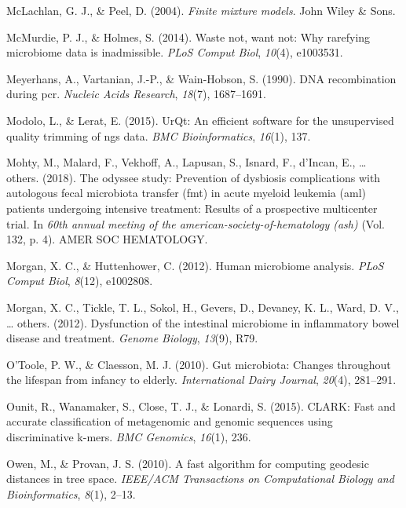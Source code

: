 \documentclass[12pt,a4paper]{reedthesis}
\theoremstyle{definition}
\theoremstyle{definition}
\theoremstyle{definition}
\theoremstyle{remark}
\begin{document}
\leavevmode\hypertarget{ref-mclachlan2004finite}{}%
McLachlan, G. J., \& Peel, D. (2004). \emph{Finite mixture models}. John Wiley \& Sons.

\leavevmode\hypertarget{ref-mcmurdie2014waste}{}%
McMurdie, P. J., \& Holmes, S. (2014). Waste not, want not: Why rarefying microbiome data is inadmissible. \emph{PLoS Comput Biol}, \emph{10}(4), e1003531.

\leavevmode\hypertarget{ref-meyerhans1990dna}{}%
Meyerhans, A., Vartanian, J.-P., \& Wain-Hobson, S. (1990). DNA recombination during pcr. \emph{Nucleic Acids Research}, \emph{18}(7), 1687--1691.

\leavevmode\hypertarget{ref-modolo2015urqt}{}%
Modolo, L., \& Lerat, E. (2015). UrQt: An efficient software for the unsupervised quality trimming of ngs data. \emph{BMC Bioinformatics}, \emph{16}(1), 137.

\leavevmode\hypertarget{ref-mohty2018odyssee}{}%
Mohty, M., Malard, F., Vekhoff, A., Lapusan, S., Isnard, F., d'Incan, E., \ldots{} others. (2018). The odyssee study: Prevention of dysbiosis complications with autologous fecal microbiota transfer (fmt) in acute myeloid leukemia (aml) patients undergoing intensive treatment: Results of a prospective multicenter trial. In \emph{60th annual meeting of the american-society-of-hematology (ash)} (Vol. 132, p. 4). AMER SOC HEMATOLOGY.

\leavevmode\hypertarget{ref-morgan2012human}{}%
Morgan, X. C., \& Huttenhower, C. (2012). Human microbiome analysis. \emph{PLoS Comput Biol}, \emph{8}(12), e1002808.

\leavevmode\hypertarget{ref-morgan2012dysfunction}{}%
Morgan, X. C., Tickle, T. L., Sokol, H., Gevers, D., Devaney, K. L., Ward, D. V., \ldots{} others. (2012). Dysfunction of the intestinal microbiome in inflammatory bowel disease and treatment. \emph{Genome Biology}, \emph{13}(9), R79.

\leavevmode\hypertarget{ref-otoole2010gut}{}%
O'Toole, P. W., \& Claesson, M. J. (2010). Gut microbiota: Changes throughout the lifespan from infancy to elderly. \emph{International Dairy Journal}, \emph{20}(4), 281--291.

\leavevmode\hypertarget{ref-ounit2015clark}{}%
Ounit, R., Wanamaker, S., Close, T. J., \& Lonardi, S. (2015). CLARK: Fast and accurate classification of metagenomic and genomic sequences using discriminative k-mers. \emph{BMC Genomics}, \emph{16}(1), 236.

\leavevmode\hypertarget{ref-owen2010fast}{}%
Owen, M., \& Provan, J. S. (2010). A fast algorithm for computing geodesic distances in tree space. \emph{IEEE/ACM Transactions on Computational Biology and Bioinformatics}, \emph{8}(1), 2--13.
\end{document}
